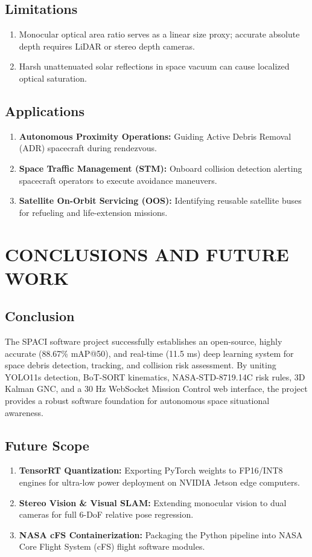 \documentclass[12pt]{report}
\begin{document}
\section{Limitations}
\begin{enumerate}
    \item Monocular optical area ratio serves as a linear size proxy; accurate absolute depth requires LiDAR or stereo depth cameras.
    \item Harsh unattenuated solar reflections in space vacuum can cause localized optical saturation.
\end{enumerate}

\section{Applications}
\begin{enumerate}
    \item \textbf{Autonomous Proximity Operations:} Guiding Active Debris Removal (ADR) spacecraft during rendezvous.
    \item \textbf{Space Traffic Management (STM):} Onboard collision detection alerting spacecraft operators to execute avoidance maneuvers.
    \item \textbf{Satellite On-Orbit Servicing (OOS):} Identifying reusable satellite buses for refueling and life-extension missions.
\end{enumerate}

\chapter{CONCLUSIONS AND FUTURE WORK}
\section{Conclusion}
The SPACI software project successfully establishes an open-source, highly accurate (88.67\% mAP@50), and real-time (11.5 ms) deep learning system for space debris detection, tracking, and collision risk assessment. By uniting YOLO11s detection, BoT-SORT kinematics, NASA-STD-8719.14C risk rules, 3D Kalman GNC, and a 30 Hz WebSocket Mission Control web interface, the project provides a robust software foundation for autonomous space situational awareness.

\section{Future Scope}
\begin{enumerate}
    \item \textbf{TensorRT Quantization:} Exporting PyTorch weights to FP16/INT8 engines for ultra-low power deployment on NVIDIA Jetson edge computers.
    \item \textbf{Stereo Vision \& Visual SLAM:} Extending monocular vision to dual cameras for full 6-DoF relative pose regression.
    \item \textbf{NASA cFS Containerization:} Packaging the Python pipeline into NASA Core Flight System (cFS) flight software modules.
\end{enumerate}
\end{document}
